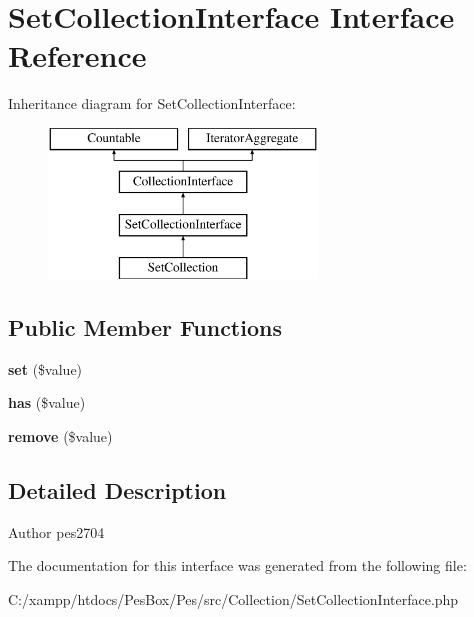 \hypertarget{interface_pes_1_1_collection_1_1_set_collection_interface}{}\section{Set\+Collection\+Interface Interface Reference}
\label{interface_pes_1_1_collection_1_1_set_collection_interface}
Inheritance diagram for Set\+Collection\+Interface\+:\begin{figure}[H]
\begin{center}
\leavevmode
\includegraphics[height=4.000000cm]{interface_pes_1_1_collection_1_1_set_collection_interface}
\end{center}
\end{figure}
\subsection*{Public Member Functions}
\begin{DoxyCompactItemize}
\item 
\mbox{\label{interface_pes_1_1_collection_1_1_set_collection_interface_a4cb9716a3dead296474d25838294ed39}} 
{\bfseries set} (\$value)
\item 
\mbox{\label{interface_pes_1_1_collection_1_1_set_collection_interface_a9abfe19436d96bcd7063759da7a48874}} 
{\bfseries has} (\$value)
\item 
\mbox{\label{interface_pes_1_1_collection_1_1_set_collection_interface_a09f38fcbfea946567deee69c5762c93d}} 
{\bfseries remove} (\$value)
\end{DoxyCompactItemize}


\subsection{Detailed Description}
\begin{DoxyAuthor}{Author}
pes2704 
\end{DoxyAuthor}


The documentation for this interface was generated from the following file\+:\begin{DoxyCompactItemize}
\item 
C\+:/xampp/htdocs/\+Pes\+Box/\+Pes/src/\+Collection/Set\+Collection\+Interface.\+php\end{DoxyCompactItemize}
